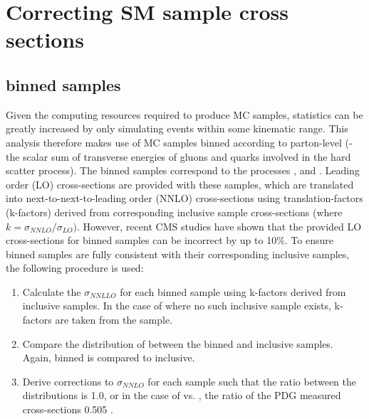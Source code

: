 \section{Correcting SM sample cross sections}
\label{sec:mc_xsec_corrs}

\subsection{\HTpart binned samples}
Given the computing resources required to produce MC samples, statistics
can be greatly increased by only simulating events within some kinematic range.
This analysis therefore makes use of MC samples binned
according to parton-level \HT (\HTpart - the scalar sum of transverse energies of gluons
and quarks involved in the hard scatter process). The binned samples
correspond to the processes \wj, \zj and \dyj.
Leading order (LO) cross-sections are provided with 
these samples, which are translated into next-to-next-to-leading order (NNLO) 
cross-sections using translation-factors (k-factors) derived from corresponding 
inclusive sample cross-sections (where $k = \sigma_{NNLO}/\sigma_{LO})$. However,
recent CMS studies \cite{RobXS} have shown that the
provided LO cross-sections for \HTpart binned samples can 
be incorrect by up to 10\%. To ensure \HTpart binned samples are fully consistent
with their corresponding inclusive samples, the following procedure is used:

\begin{enumerate}
\item Calculate the $\sigma_{NNLLO}$ for each \HTpart binned sample using k-factors derived from inclusive samples.
In the case of \zj where no such inclusive sample exists, k-factors are taken from the \dyj sample.
\item Compare the distribution of \HTpart between the binned and inclusive samples. Again, \zj binned is compared to \dyj inclusive.
\item Derive corrections to $\sigma_{NNLO}$ for each \HTpart sample such that the ratio between the \HTpart distributions
is 1.0, or in the case of \zj vs. \dyj, the ratio of the PDG measured cross-sections 0.505 \cite{Agashe:2014kda}.
\end{enumerate}

